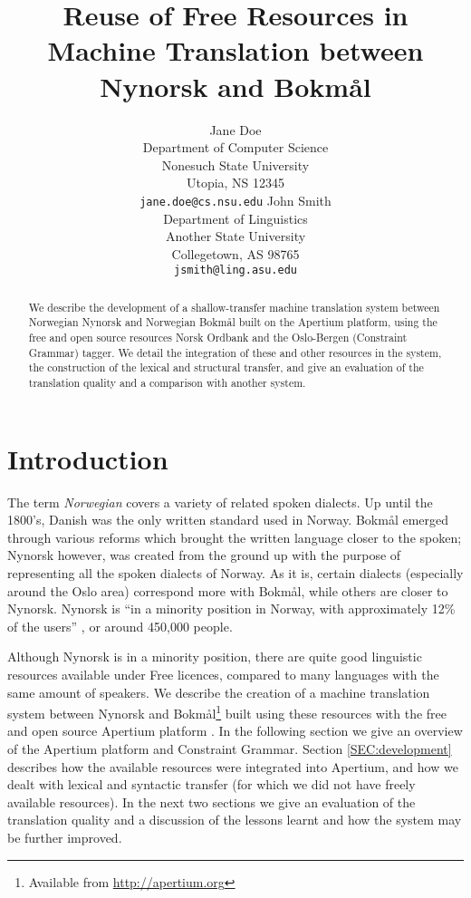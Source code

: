 \documentclass[11pt]{article}
\author{Jane Doe\\  Department of Computer Science \\  Nonesuch State University \\  Utopia, NS 12345 \\  {\tt jane.doe@cs.nsu.edu} \And  John Smith \\  Department of Linguistics \\  Another State University \\  Collegetown, AS 98765 \\    {\tt jsmith@ling.asu.edu}}
\title{Reuse of Free Resources in Machine Translation between Nynorsk and Bokmål}
\begin{document}
\maketitle

  \begin{abstract}
    We describe the development of a shallow-transfer machine
    translation system between Norwegian Nynorsk and Norwegian Bokmål
    built on the Apertium platform, using the free and open source
    resources Norsk Ordbank and the Oslo-Bergen (Constraint Grammar)
    tagger. We detail the integration of these and other resources in
    the system, the construction of the lexical and structural
    transfer, and give an evaluation of the translation quality and a
    comparison with another system.
  \end{abstract}

\section{Introduction}

The term \emph{Norwegian} covers a variety of related spoken dialects.
Up until the 1800's, Danish was the only written standard used in
Norway. Bokmål emerged through various reforms which brought the
written language closer to the spoken; Nynorsk however, was created
from the ground up with the purpose of representing all the spoken
dialects of Norway. As it is, certain dialects (especially around the
Oslo area) correspond more with Bokmål, while others are closer to
Nynorsk. Nynorsk is ``in a minority position in Norway, with
approximately 12\% of the users'' \citep{everson2000sln}, or around
450,000 people.

Although Nynorsk is in a minority position, there are quite good
linguistic resources available under Free licences, compared to many
languages with the same amount of speakers. We describe the creation
of a machine translation system between Nynorsk and
Bokmål\footnote{Available from
  \href{http://apertium.org}{http://apertium.org} } built using these
resources with the free and open source Apertium platform
\citep{corbi05oss}. In the following section we give an overview of
the Apertium platform and Constraint Grammar. Section
\ref{SEC:development} describes how the available resources were
integrated into Apertium, and how we dealt with lexical and syntactic
transfer (for which we did not have freely available resources). In
the next two sections we give an evaluation of the translation quality
and a discussion of the lessons learnt and how the system may be
further improved.
\end{document}
